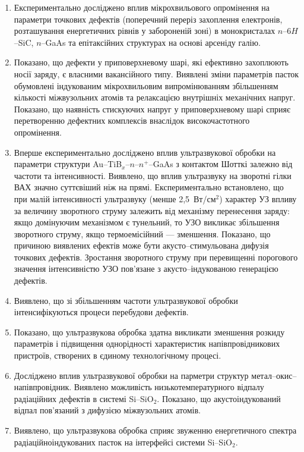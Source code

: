   \begin{enumerate}[leftmargin=0cm,itemindent=3em]
\item Експериментально досліджено вплив мікрохвильового опромінення на параметри точкових дефектів (поперечний переріз захоплення електронів,
розташування енергетичних рівнів у забороненій зоні) в монокристалах $n$--6$H$--SiC, $n$--GaAs та епітаксійних структурах на основі арсеніду галію.


\item Показано, що  дефекти у приповерхневому шарі, які ефективно захоплюють носії заряду, є власними вакансійного типу.
Виявлені зміни параметрів пасток обумовлені індукованим мікрохвильовим випромінюванням
збільшенням кількості міжвузольних атомів та релаксацією внутрішніх механічних напруг.
Показано, що наявність стискуючих напруг у приповерхневому шарі сприяє перетворенню дефектних комплексів внаслідок високочастотного опромінення.

     \item Вперше експериментально досліджено вплив ультразвукової обробки на параметри структури Au--TiB$_x$--$n$--$n^+$--GaAs з контактом Шотткі
залежно від частоти та інтенсивності.
Виявлено, що вплив ультразвуку на зворотні гілки ВАХ значно суттєвіший ніж на прямі.
 Експериментально встановлено, що при малій інтенсивності ультразвуку (менше 2,5~Вт/см$^2$) характер УЗ впливу за величину зворотного струму залежить від механізму перенесення заряду:
  якщо домінуючим механізмом є тунельний, то УЗО викликає збільшення зворотного струму, якщо термоемісійний --- зменшення.
  Показано, що причиною виявлених ефектів може бути акусто--стимульована дифузія точкових дефектів.
  Зростання зворотного струму при перевищенні порогового значення інтенсивністю УЗО пов'язане з акусто--індукованою генерацією дефектів.

\item Виявлено, що зі збільшенням частоти ультразвукової обробки інтенсифікуються процеси перебудови дефектів.

\item Показано, що ультразвукова обробка здатна викликати зменшення розкиду параметрів і підвищення однорідності характеристик напівпровідникових пристроїв, створених в єдиному технологічному процесі.

\item Досліджено вплив ультразвукової обробки на парметри структур метал--окис--напівпровідник.
   Виявлено можливість низькотемпературного відпалу радіаційних дефектів в системі Si--SiO$_2$.
   Показано, що акустоіндукований відпал пов'язаний з дифузією міжвузольних атомів.

\item Виявлено, що ультразвукова обробка сприяє звуженню енергетичного спектра радіаційноіндукованих пасток
на інтерфейсі системи    Si--SiO$_2$.


\end{enumerate}	



